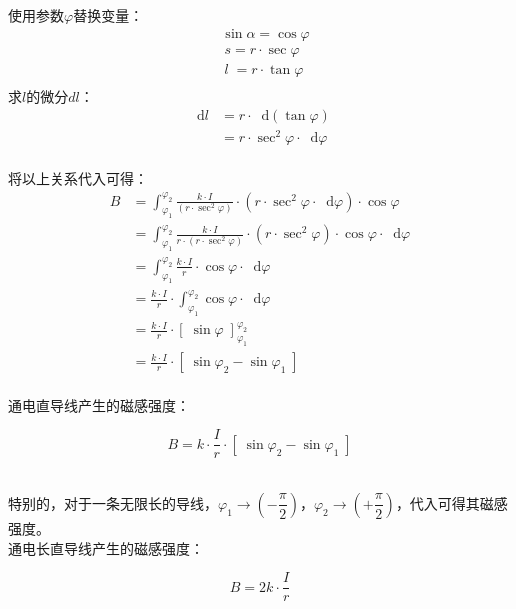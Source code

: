 \documentclass[UTF8]{ctexart}
\newcommand*{\dif}{\mathop{}\!\mathrm{d}}
\begin{document}
\newpage

    使用参数$\varphi$替换变量：
    \begin{align}
        &\sin{\alpha}=\cos{\varphi}\\[3mm]
        &~s=r\cdot\sec{\varphi}\\[3mm]
        &~l\;=r\cdot\tan{\varphi}\\[3mm]
    \end{align}
    求$l$的微分$dl$：
    \begin{align}
        \dif l
        &=r\cdot\dif(\tan{\varphi})\\[3mm]
        &=r\cdot\sec^2{\varphi}\cdot\dif\varphi
    \end{align}\\
    将以上关系代入可得：\vspace{5pt}
    \begin{align}
        B
        &=\int_{\varphi_1}^{\varphi_2} \frac{k\cdot I}{\left(r\cdot\sec^2{\varphi}\right)}\cdot\left(r\cdot\sec^2{\varphi}\cdot\dif \varphi\right)\cdot\cos{\varphi}\\[3mm]
        &=\int_{\varphi_1}^{\varphi_2} \frac{k\cdot I}{r\cdot\left(r\cdot\sec^2{\varphi}\right)}\cdot\left(r\cdot\sec^2{\varphi}\right)\cdot\cos{\varphi}\cdot\dif \varphi\\[3mm]
        &=\int_{\varphi_1}^{\varphi_2} \frac{k\cdot I}{r}\cdot\cos{\varphi}\cdot\dif \varphi\\[3mm]
        &=\frac{k\cdot I}{r}\cdot\int_{\varphi_1}^{\varphi_2}\cos{\varphi}\cdot\dif \varphi\\[3mm]
        &=\frac{k\cdot I}{r}\cdot\left[\;\sin{\varphi}\;\right]_{\varphi_1}^{\varphi_2}\\[3mm]
        &=\frac{k\cdot I}{r}\cdot\left[\;\sin{\varphi_2}-\sin{\varphi_1}\;\right]
    \end{align}\\
    通电直导线产生的磁感强度：
    \begin{large}
        \begin{equation*}
            B=k\cdot\frac{I}{r}\cdot\left[\;\sin{\varphi_2}-\sin{\varphi_1}\;\right]
        \end{equation*}
    \end{large}\\[1mm]
    特别的，对于一条无限长的导线，$\varphi_1\rightarrow\left(-\dfrac{\pi}{2}\right)$，$\varphi_2\rightarrow\left(+\dfrac{\pi}{2}\right)$，代入可得其磁感强度。\\[3mm]
    通电长直导线产生的磁感强度：
    \begin{large}
        \begin{equation*}
            B=2k\cdot\frac{I}{r}
        \end{equation*}
    \end{large}
\end{document}
